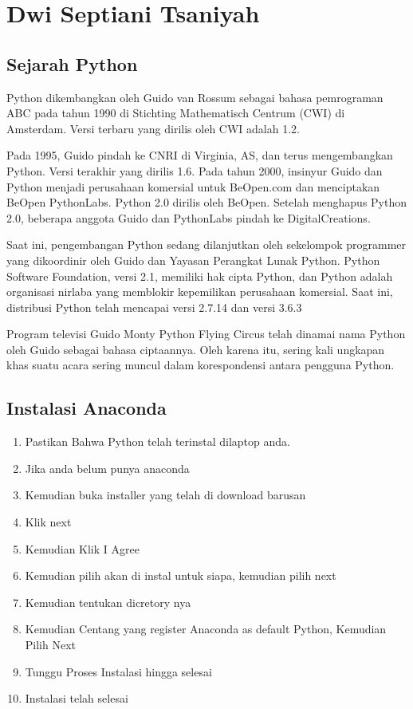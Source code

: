 \section{Dwi Septiani Tsaniyah}
\subsection{Sejarah Python}

Python dikembangkan oleh Guido van Rossum sebagai bahasa pemrograman ABC pada tahun 1990 di Stichting Mathematisch Centrum (CWI) di Amsterdam. Versi terbaru yang dirilis oleh CWI adalah 1.2.

Pada 1995, Guido pindah ke CNRI di Virginia, AS, dan terus mengembangkan Python. Versi terakhir yang dirilis 1.6. Pada tahun 2000, insinyur Guido dan Python menjadi perusahaan komersial untuk BeOpen.com dan menciptakan BeOpen PythonLabs. Python 2.0 dirilis oleh BeOpen. Setelah menghapus Python 2.0, beberapa anggota Guido dan PythonLabs pindah ke DigitalCreations.

Saat ini, pengembangan Python sedang dilanjutkan oleh sekelompok programmer yang dikoordinir oleh Guido dan Yayasan Perangkat Lunak Python. Python Software Foundation, versi 2.1, memiliki hak cipta Python, dan Python adalah organisasi nirlaba yang memblokir kepemilikan perusahaan komersial. Saat ini, distribusi Python telah mencapai versi 2.7.14 dan versi 3.6.3

Program televisi Guido Monty Python Flying Circus telah dinamai nama Python oleh Guido sebagai bahasa ciptaannya. Oleh karena itu, sering kali ungkapan khas suatu acara sering muncul dalam korespondensi antara pengguna Python.

\subsection{Instalasi Anaconda}
\begin{enumerate}
    \item Pastikan Bahwa Python telah terinstal dilaptop anda.
    \item Jika anda belum punya anaconda
    \item Kemudian buka installer yang telah di download barusan
    \item Klik next


    \item Kemudian Klik I Agree


    \item Kemudian pilih akan di instal untuk siapa, kemudian pilih next


    \item Kemudian tentukan dicretory nya


    \item Kemudian Centang yang register Anaconda as default Python, Kemudian Pilih Next


    \item Tunggu Proses Instalasi hingga selesai


    \item Instalasi telah selesai
	\end{enumerate}

